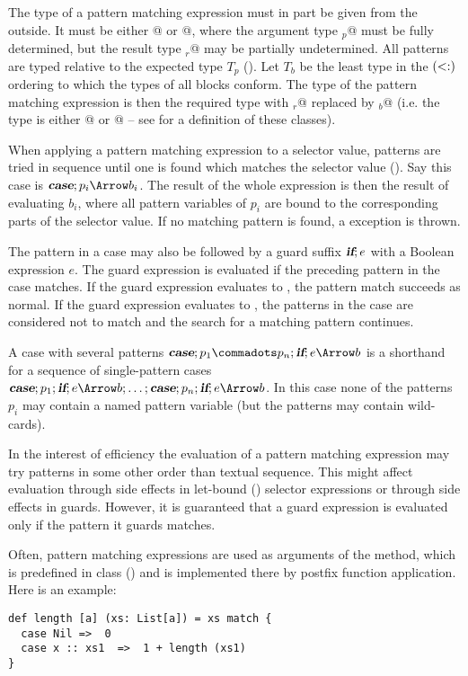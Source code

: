 \documentclass[11pt]{report}
\begin{document}
The type of a pattern matching expression must in part be given from
the outside. It must be either \verb@Function[T$_p$, T$_r$]@ or
\verb@PartialFunction[T$_p$, T$_r$]@, where the argument type
\verb@T$_p$@ must be fully determined, but the result type \verb@T$_r$@
may be partially undetermined.  All patterns are typed relative to the
expected type $T_p$ ().  Let $T_b$ be the least
type in the $(<:)$ ordering to which the types of all blocks
conform.  The type of the pattern matching expression is then the
required type with \verb@T$_r$@ replaced by \verb@T$_b$@ (i.e. the
type is either \verb@Function[T$_p$, T$_b$]@ or
\verb@PartialFunction[T$_p$, T$_b$]@ -- see  for
a definition of these classes).

When applying a pattern matching expression to a selector value,
patterns are tried in sequence until one is found which matches the
selector value (). Say this case is $\CASE;p_i
\Arrow b_i$.  The result of the whole expression is then the result of
evaluating $b_i$, where all pattern variables of $p_i$ are bound to
the corresponding parts of the selector value.  If no matching pattern
is found, a \verb@MatchError@ exception is thrown.

The pattern in a case may also be followed by a guard suffix $\mbox{\sl\bfseries if};e$
with a Boolean expression $e$.  The guard expression is evaluated if
the preceding pattern in the case matches. If the guard expression
evaluates to \verb@True@, the pattern match succeeds as normal. If the
guard expression evaluates to \verb@False@, the patterns in the case
are considered not to match and the search for a matching pattern
continues.

A case with several patterns $\CASE;p_1 \commadots p_n ;\IF; e \Arrow b$  is a
shorthand for a sequence of single-pattern cases $\CASE;p_1;\IF;e \Arrow b
;\ldots; \CASE;p_n ;\IF;e\Arrow b$. In this case none of the patterns
$p_i$ may contain a named pattern variable (but the patterns may contain
wild-cards).

In the interest of efficiency the evaluation of a pattern matching
expression may try patterns in some other order than textual
sequence. This might affect evaluation through side effects in
let-bound () selector expressions or through side
effects in guards. However, it is guaranteed that a guard expression
is evaluated only if the pattern it guards matches.


\example
Often, pattern matching expressions are used as arguments
of the \verb@match@ method, which is predefined in class \verb@Any@
() and is implemented there by postfix function
application. Here is an example:
\begin{verbatim}
def length [a] (xs: List[a]) = xs match {
  case Nil =>  0
  case x :: xs1  =>  1 + length (xs1)
}
\end{verbatim}
\end{document}
